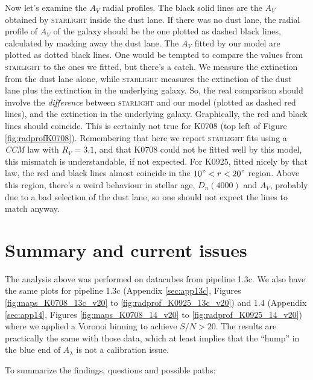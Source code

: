 \documentclass[a4paper]{article}
\def\starlight{\textsc{starlight}\xspace}
\def\CCM{\textit{CCM}\xspace}
\begin{document}
Now let's examine the $A_V$ radial profiles. The black solid lines are the $A_V$
obtained by \starlight inside the dust lane. If there was no dust lane, the
radial profile of $A_V$ of the galaxy should be the one plotted as dashed black
lines, calculated by masking away the dust lane. The $A_V$ fitted by our model
are plotted as dotted black lines. One would be tempted to compare the values
from \starlight to the ones we fitted, but there's a catch. We measure the
extinction from the dust lane alone, while \starlight measures the extinction of
the dust lane plus the extinction in the underlying galaxy. So, the real
comparison should involve the {\em difference} between \starlight and our model
(plotted as dashed red lines), and the extinction in the underlying galaxy.
Graphically, the red and black lines should coincide. This is certainly not true
for K0708 (top left of Figure \ref{fig:radprofK0708}). Remembering that here we
report \starlight fits using a \CCM law with $R_V = 3.1$, and that K0708 could not be fitted well by this
model, this mismatch is understandable, if not expected. For K0925, fitted
nicely by that law, the red and black lines almost coincide in the $10" < r <
20"$ region. Above this region, there's a weird behaviour in stellar age,
$D_n(4000)$ and $A_V$, probably due to a bad selection of the dust lane, so one
should not expect the lines to match anyway.


\section{Summary and current issues}

The analysis above was performed on datacubes from pipeline 1.3c. We also have
the same plots for pipeline 1.3c (Appendix \ref{sec:app13c}, Figures
\ref{fig:maps_K0708_13c_v20} to \ref{fig:radprof_K0925_13c_v20}) and 1.4
(Appendix \ref{sec:app14}, Figures \ref{fig:maps_K0708_14_v20} to
\ref{fig:radprof_K0925_14_v20}) where we applied a Voronoi binning to achieve
$S/N > 20$. The results are practically the same with those data, which at least
implies that the ``hump'' in the blue end of $A_\lambda$ is not a calibration
issue.

To summarize the findings, questions and possible paths:
\end{document}
